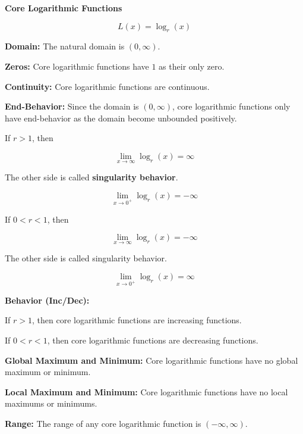 \documentclass{ximera}
\begin{document}
\begin{explanation} \textbf{\textcolor{red!75!green}{Core Logarithmic Functions}} 


\[ L(x) = \log_r(x)  \]



\textbf{Domain:} The natural domain is $(0, \infty)$.

\textbf{Zeros:} Core logarithmic functions have $1$ as their only zero.



\textbf{Continuity:} Core logarithmic functions are continuous.



\textbf{End-Behavior:} Since the domain is $(0, \infty)$, core logarithmic functions only have end-behavior as the domain become unbounded positively.


If $r > 1$, then

\[
\lim\limits_{x \to \infty} \log_r(x) = \infty
\]


The other side is called \textbf{singularity behavior}.

\[
\lim\limits_{x \to 0^+} \log_r(x) = -\infty
\]





If $0 < r < 1$, then

\[
\lim\limits_{x \to \infty} \log_r(x) = -\infty
\]


The other side is called singularity behavior.

\[
\lim\limits_{x \to 0^+} \log_r(x) = \infty
\]







\textbf{Behavior (Inc/Dec):} 




If $r > 1$, then core logarithmic functions are increasing functions.


If $0 < r < 1$, then core logarithmic functions are decreasing functions.





\textbf{Global Maximum and Minimum:} Core logarithmic functions have no global maximum or minimum.

\textbf{Local Maximum and Minimum:}  Core logarithmic functions have no local maximums or minimums.

\textbf{Range:} The range of any core logarithmic function is $(-\infty,\infty)$.

\end{explanation}
\end{document}
